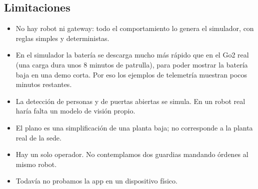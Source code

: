 \subsection{Limitaciones}

\begin{itemize}
  \item No hay robot ni gateway: todo el comportamiento lo genera el simulador, con reglas simples y deterministas.
  \item En el simulador la batería se descarga mucho más rápido que en el Go2 real (una carga dura unos 8 minutos de patrulla), para poder mostrar la batería baja en una demo corta. Por eso los ejemplos de telemetría muestran pocos minutos restantes.
  \item La detección de personas y de puertas abiertas se simula. En un robot real haría falta un modelo de visión propio.
  \item El plano es una simplificación de una planta baja; no corresponde a la planta real de la sede.
  \item Hay un solo operador. No contemplamos dos guardias mandando órdenes al mismo robot.
  \item Todavía no probamos la app en un dispositivo físico.
\end{itemize}
